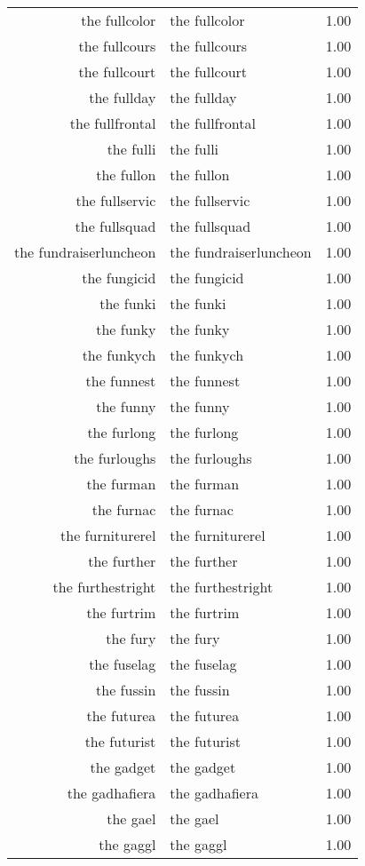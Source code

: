 \begin{table}[ht]
\begin{tabular}{rlr}
  the fullcolor & the fullcolor & 1.00 \\ 
  the fullcours & the fullcours & 1.00 \\ 
  the fullcourt & the fullcourt & 1.00 \\ 
  the fullday & the fullday & 1.00 \\ 
  the fullfrontal & the fullfrontal & 1.00 \\ 
  the fulli & the fulli & 1.00 \\ 
  the fullon & the fullon & 1.00 \\ 
  the fullservic & the fullservic & 1.00 \\ 
  the fullsquad & the fullsquad & 1.00 \\ 
  the fundraiserluncheon & the fundraiserluncheon & 1.00 \\ 
  the fungicid & the fungicid & 1.00 \\ 
  the funki & the funki & 1.00 \\ 
  the funky & the funky & 1.00 \\ 
  the funkych & the funkych & 1.00 \\ 
  the funnest & the funnest & 1.00 \\ 
  the funny & the funny & 1.00 \\ 
  the furlong & the furlong & 1.00 \\ 
  the furloughs & the furloughs & 1.00 \\ 
  the furman & the furman & 1.00 \\ 
  the furnac & the furnac & 1.00 \\ 
  the furniturerel & the furniturerel & 1.00 \\ 
  the further & the further & 1.00 \\ 
  the furthestright & the furthestright & 1.00 \\ 
  the furtrim & the furtrim & 1.00 \\ 
  the fury & the fury & 1.00 \\ 
  the fuselag & the fuselag & 1.00 \\ 
  the fussin & the fussin & 1.00 \\ 
  the futurea & the futurea & 1.00 \\ 
  the futurist & the futurist & 1.00 \\ 
  the gadget & the gadget & 1.00 \\ 
  the gadhafiera & the gadhafiera & 1.00 \\ 
  the gael & the gael & 1.00 \\ 
  the gaggl & the gaggl & 1.00 \\ 

\end{tabular}
\end{table}
